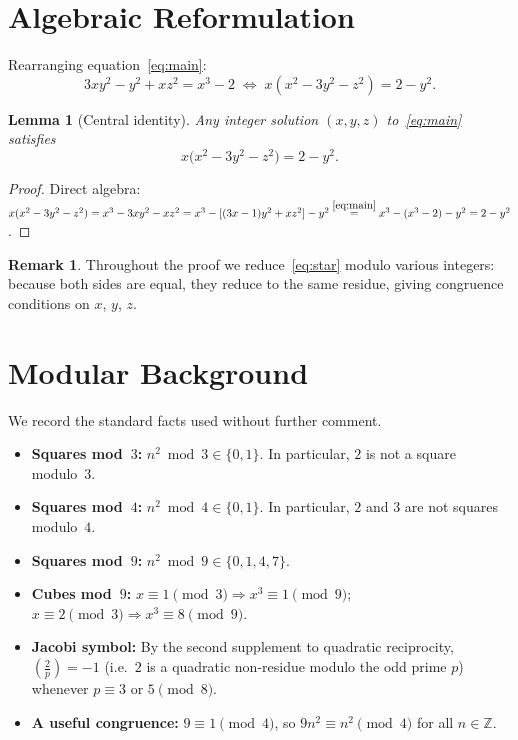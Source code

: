 \documentclass[12pt, a4paper]{amsart}
\theoremstyle{plain}
\newtheorem{lemma}[theorem]{Lemma}
\theoremstyle{definition}
\newtheorem{remark}[theorem]{Remark}
\begin{document}
\section{Algebraic Reformulation}

Rearranging equation~\eqref{eq:main}:
\[
  3xy^2 - y^2 + xz^2 = x^3 - 2
  \;\Longleftrightarrow\;
  x(x^2 - 3y^2 - z^2) = 2 - y^2.
\]

\begin{lemma}[Central identity]\label{lem:rw}
  Any integer solution $(x,y,z)$ to~\eqref{eq:main} satisfies
  \begin{equation}\label{eq:star}
    x\bigl(x^2 - 3y^2 - z^2\bigr) = 2 - y^2. \tag{$*$}
  \end{equation}
\end{lemma}

\begin{proof}
  Direct algebra: $x(x^2-3y^2-z^2) = x^3 - 3xy^2 - xz^2
  = x^3 - [(3x-1)y^2 + xz^2] - y^2
  \overset{\eqref{eq:main}}{=} x^3 - (x^3-2) - y^2 = 2 - y^2$.
\end{proof}

\begin{remark}
  Throughout the proof we reduce~\eqref{eq:star} modulo various integers:
  because both sides are equal, they reduce to the same residue, giving
  congruence conditions on $x$, $y$, $z$.
\end{remark}

\section{Modular Background}
\label{sec:background}

We record the standard facts used without further comment.

\begin{itemize}[leftmargin=2em]
  \item \textbf{Squares mod~$3$:} $n^2 \bmod 3 \in \{0,1\}$.  In particular,
        $2$ is not a square modulo~$3$.
  \item \textbf{Squares mod~$4$:} $n^2 \bmod 4 \in \{0,1\}$.  In particular,
        $2$ and $3$ are not squares modulo~$4$.
  \item \textbf{Squares mod~$9$:} $n^2 \bmod 9 \in \{0,1,4,7\}$.
  \item \textbf{Cubes mod~$9$:}
        $x \equiv 1 \pmod{3} \Rightarrow x^3 \equiv 1 \pmod{9}$;
        $x \equiv 2 \pmod{3} \Rightarrow x^3 \equiv 8 \pmod{9}$.
  \item \textbf{Jacobi symbol:}
        By the second supplement to quadratic reciprocity,
        $\left(\tfrac{2}{p}\right) = -1$ (i.e.\ $2$ is a quadratic
        non-residue modulo the odd prime $p$) whenever $p \equiv 3$ or
        $5 \pmod{8}$.
  \item \textbf{A useful congruence:} $9 \equiv 1 \pmod{4}$, so
        $9n^2 \equiv n^2 \pmod{4}$ for all $n \in \mathbb{Z}$.
\end{itemize}
\end{document}
